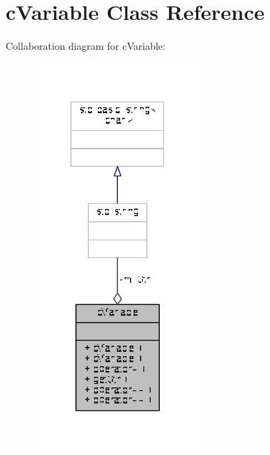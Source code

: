 \hypertarget{classcVariable}{\section{c\-Variable Class Reference}
\label{classcVariable}
}


Collaboration diagram for c\-Variable\-:
\nopagebreak
\begin{figure}[H]
\begin{center}
\leavevmode
\includegraphics[width=176pt]{classcVariable__coll__graph}
\end{center}
\end{figure}
